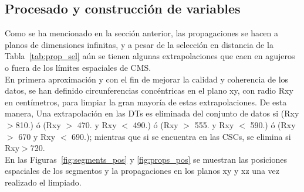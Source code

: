 \subsection{Procesado y construcci\'on de variables}\label{sec:procesado}

Como se ha mencionado en la secci\'on anterior, las propagaciones se hacen a planos de dimensiones infinitas, y a pesar de la selecci\'on en distancia de la Tabla~\ref{tab:prop_sel} a\'un se tienen algunas extrapolaciones que caen en agujeros o fuera de los l\'imites espaciales de CMS. \\
En primera aproximaci\'on y con el fin de mejorar la calidad y coherencia de los datos, se han definido circunferencias conc\'entricas en el plano xy, con radio Rxy en cent\'imetros, para limpiar la gran mayor\'ia de estas extrapolaciones. De esta manera, Una extrapolaci\'on en las DTs es eliminada del conjunto de datos si (Rxy$>$810.) \'o (Rxy $>$ 470. y Rxy $<$ 490.) \'o (Rxy $>$ 555. y  Rxy $<$ 590.) \'o (Rxy $>$ 670 y Rxy $<$ 690.); mientras que si se encuentra en las CSCs, se elimina si Rxy$>$720. \\

En las Figuras~\ref{fig:segments_pos} y \ref{fig:props_pos} se muestran las posiciones espaciales de los segmentos y la propagaciones en los planos xy y xz una vez realizado el limpiado. \\


